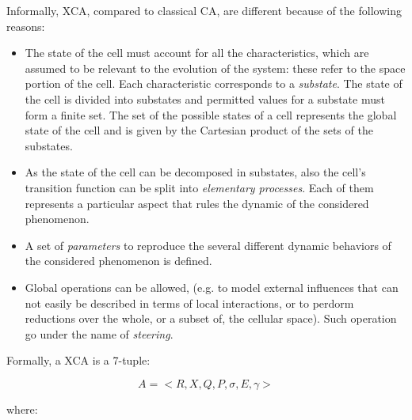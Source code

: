 Informally, XCA, compared to classical CA, are different because of
the following reasons:

\begin{itemize}

\item The state of the cell must account for all the characteristics,
  which are assumed to be relevant to the evolution of the system:
  these refer to the space portion of the cell. Each characteristic
  corresponds to a \emph{substate}. The state of the cell is divided
  into substates and permitted values for a substate must form a
  finite set. The set of the possible states of a cell represents the
  global state of the cell and is given by the Cartesian product of
  the sets of the substates.

\item As the state of the cell can be decomposed in substates, also
  the cell's transition function can be split into \emph{elementary
    processes}. Each of them represents a particular aspect that rules
  the dynamic of the considered phenomenon.

\item A set of \emph{parameters} to reproduce the several different
  dynamic behaviors of the considered phenomenon is defined.

\item Global operations can be allowed, (e.g. to model external
  influences that can not easily be described in terms of local
  interactions, or to perdorm reductions over the whole, or a subset of,
  the cellular space). Such operation go under the name of
  \emph{steering}.
  
\end{itemize}

\noindent Formally, a XCA is a 7-tuple:

$$ A = <R,X,Q,P,\sigma,E,\gamma>$$

\noindent where:

